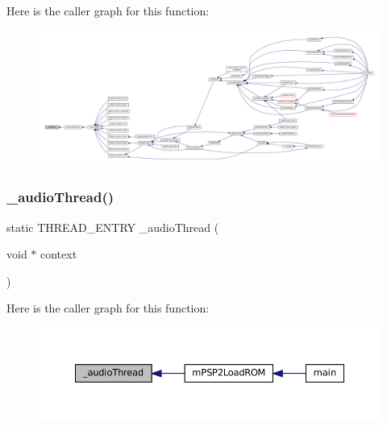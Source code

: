 Here is the caller graph for this function\+:
\nopagebreak
\begin{figure}[H]
\begin{center}
\leavevmode
\includegraphics[width=350pt]{psp2-context_8c_aa83416a22e1427905c8e5a0f3518205d_icgraph}
\end{center}
\end{figure}
\mbox{\label{psp2-context_8c_adba523845bb9885cdad18a6753665635}} 
\subsubsection{\texorpdfstring{\+\_\+audio\+Thread()}{\_audioThread()}}
{\footnotesize\ttfamily static T\+H\+R\+E\+A\+D\+\_\+\+E\+N\+T\+RY \+\_\+audio\+Thread (\begin{DoxyParamCaption}\item[{void $\ast$}]{context }\end{DoxyParamCaption})\hspace{0.3cm}{\ttfamily [static]}}

Here is the caller graph for this function\+:
\nopagebreak
\begin{figure}[H]
\begin{center}
\leavevmode
\includegraphics[width=350pt]{psp2-context_8c_adba523845bb9885cdad18a6753665635_icgraph}
\end{center}
\end{figure}
\mbox{\label{psp2-context_8c_a8c8e8d5d2406306e272f2388bb3a8e20}} 
